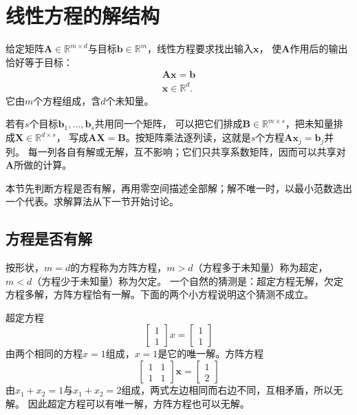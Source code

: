 
\section{线性方程的解结构}
\label{sec:ls-exact-linear-equations}
\label{sec:linear-algebra-exact-systems}

给定矩阵$\bm A\in\mathbb R^{m\times d}$与目标$\bm b\in\mathbb R^m$，线性方程要求找出输入$\bm x$，
使$\bm A$作用后的输出恰好等于目标：
\begin{equation}
\begin{gathered}
\bm A\bm x=\bm b\\
\bm x\in\mathbb R^d.
\end{gathered}
\label{eq:linear-algebra-linear-system}
\end{equation}
它由$m$个方程组成，含$d$个未知量。

若有$s$个目标$\bm b_1,\ldots,\bm b_s$共用同一个矩阵，
可以把它们排成$\bm B\in\mathbb R^{m\times s}$，把未知量排成$\bm X\in\mathbb R^{d\times s}$，
写成$\bm A\bm X=\bm B$。按矩阵乘法逐列读，这就是$s$个方程$\bm A\bm x_j=\bm b_j$并列。
每一列各自有解或无解，互不影响；它们只共享系数矩阵，因而可以共享对$\bm A$所做的计算。

本节先判断方程是否有解，再用零空间描述全部解；解不唯一时，以最小范数选出一个代表。求解算法从下一节开始讨论。

\subsection{方程是否有解}
\label{sec:ls-solution-cases}

按形状，$m=d$的方程称为方阵方程，$m>d$（方程多于未知量）称为超定，$m<d$（方程少于未知量）称为欠定。
一个自然的猜测是：超定方程无解，欠定方程多解，方阵方程恰有一解。下面的两个小方程说明这个猜测不成立。

\begin{example}[反例：形状不决定解的情况]
\label{ex:ls-shape-not-decisive}
超定方程
\[
 \begin{bmatrix}1\\1\end{bmatrix}x=\begin{bmatrix}1\\1\end{bmatrix}
\]
由两个相同的方程$x=1$组成，$x=1$是它的唯一解。方阵方程
\[
 \begin{bmatrix}1&1\\1&1\end{bmatrix}\bm x=\begin{bmatrix}1\\2\end{bmatrix}
\]
由$x_1+x_2=1$与$x_1+x_2=2$组成，两式左边相同而右边不同，互相矛盾，所以无解。
因此超定方程可以有唯一解，方阵方程也可以无解。
\end{example}

